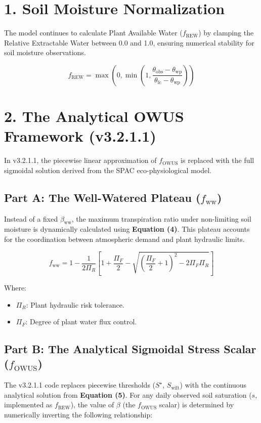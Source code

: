 \documentclass[11pt]{article}
\begin{document}
\section*{1. Soil Moisture Normalization}

The model continues to calculate Plant Available Water ($f_{\mathrm{REW}}$) by clamping the Relative Extractable Water between 0.0 and 1.0, ensuring numerical stability for soil moisture observations.

$$  f_{\mathrm{REW}} = \max\left(0, \min\left(1, \frac{\theta_{\mathrm{obs}} - \theta_{\mathrm{wp}}}{\theta_{\mathrm{fc}} - \theta_{\mathrm{wp}}}\right)\right)$$

\section*{2. The Analytical OWUS Framework (v3.2.1.1)}

In v3.2.1.1, the piecewise linear approximation of $f_{\mathrm{OWUS}}$ is replaced with the full sigmoidal solution derived from the SPAC eco-physiological model.

\subsection*{Part A: The Well-Watered Plateau ($f_{\mathrm{ww}}$)}

Instead of a fixed $\beta_{\mathrm{ww}}$, the maximum transpiration ratio under non-limiting soil moisture is dynamically calculated using \textbf{Equation (4)}. This plateau accounts for the coordination between atmospheric demand and plant hydraulic limits.

$$    f_{\mathrm{ww}} = 1 - \frac{1}{2\Pi_R} \left[ 1 + \frac{\Pi_F}{2} - \sqrt{\left( \frac{\Pi_F}{2} + 1 \right)^2 - 2\Pi_F\Pi_R} \right]$$

Where:
\begin{itemize}
\item $\Pi_R$: Plant hydraulic risk tolerance.
\item $\Pi_F$: Degree of plant water flux control.
\end{itemize}

\subsection*{Part B: The Analytical Sigmoidal Stress Scalar ($f_{\mathrm{OWUS}}$)}

The v3.2.1.1 code replaces piecewise thresholds ($S^\star$, $S_{\mathrm{wilt}}$) with the continuous analytical solution from \textbf{Equation (5)}. For any daily observed soil saturation ($s$, implemented as $f_{\mathrm{REW}}$), the value of $\beta$ (the $f_{\mathrm{OWUS}}$ scalar) is determined by numerically inverting the following relationship:
\end{document}
